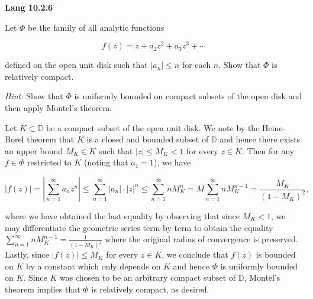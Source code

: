 \textbf{Lang 10.2.6}

Let $\Phi$ be the family of all analytic functions

$$
f(z) = z + a_2 z^2 + a_3 z^3 + \cdots
$$

defined on the open unit disk such that $|a_n| \le n$ for each $n$. Show that $\Phi$ is relatively compact.

\textit{Hint:} Show that $\Phi$ is uniformly bounded on compact subsets of the open disk and then apply Montel's 
theorem.

\begin{solution}
  Let $K \subset \mathbb{D}$ be a compact subset of the open unit disk. We note by the Heine-Borel theorem that $K$ is a
  closed and bounded subset of $\mathbb{D}$ and hence there exists an upper bound $M_K \in K$ such that 
  $|z| \le M_K < 1$ for every $z \in K$. Then for any $f \in \Phi$ restricted to $K$ (noting that $a_1 = 1$), we have

  $$
    |f(z)| = \left| \sum\limits_{n=1}^{\infty} a_n z^n \right|
           \le \sum\limits_{n=1}^{\infty} |a_n| \cdot |z|^n
           \le \sum\limits_{n=1}^{\infty} n M_K^n
           = M \sum\limits_{n=1}^{\infty} n M_K^{n-1}
           = \frac{M_K}{(1 - M_K)^2},
  $$
  
  where we have obtained the last equality by observing that since $M_K < 1$, we may differentiate the geometric series
  term-by-term to obtain the equality $\sum\limits_{n=1}^{\infty} n M_K^{n-1} = \frac{1}{(1 - M_K)^2}$ where the
  original radius of convergence is preserved. Lastly, since $|f(z)| \le M_K$ for every $z \in K$, we conclude that
  $f(z)$ is bounded on $K$ by a constant which only depends on $K$ and hence $\Phi$ is uniformly bounded on $K$. Since
  $K$ was chosen to be an arbitrary compact subset of $\mathbb{D}$, Montel's theorem implies that $\Phi$ is relatively
  compact, as desired.
  \ \\
\end{solution}

